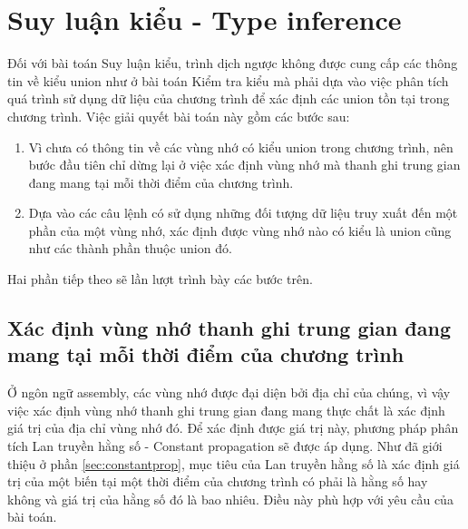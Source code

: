 \chapter{Suy luận kiểu - Type inference}

Đối với bài toán Suy luận kiểu, trình dịch ngược không được cung cấp các thông tin về kiểu union như ở bài toán Kiểm tra kiểu mà phải dựa vào việc phân tích quá trình sử dụng dữ liệu của chương trình để xác định các union tồn tại trong chương trình. Việc giải quyết bài toán này gồm các bước sau:

\begin{enumerate}
	\item Vì chưa có thông tin về các vùng nhớ có kiểu union trong chương trình, nên bước đầu tiên chỉ dừng lại ở việc xác định vùng nhớ mà thanh ghi trung gian đang mang tại mỗi thời điểm của chương trình.
	\item Dựa vào các câu lệnh có sử dụng những đối tượng dữ liệu truy xuất đến một phần của một vùng nhớ, xác định được vùng nhớ nào có kiểu là union cũng như các thành phần thuộc union đó.
\end{enumerate}

Hai phần tiếp theo sẽ lần lượt trình bày các bước trên.

\section{Xác định vùng nhớ thanh ghi trung gian đang mang tại mỗi thời điểm của chương trình}

Ở ngôn ngữ assembly, các vùng nhớ được đại diện bởi địa chỉ của chúng, vì vậy việc xác định vùng nhớ thanh ghi trung gian đang mang thực chất là xác định giá trị của địa chỉ vùng nhớ đó. Để xác định được giá trị này, phương pháp phân tích Lan truyền hằng số - Constant propagation sẽ được áp dụng. Như đã giới thiệu ở phần \ref{sec:constantprop}, mục tiêu của Lan truyền hằng số là xác định giá trị của một biến tại một thời điểm của chương trình có phải là hằng số hay không và giá trị của hằng số đó là bao nhiêu. Điều này phù hợp với yêu cầu của bài toán.

